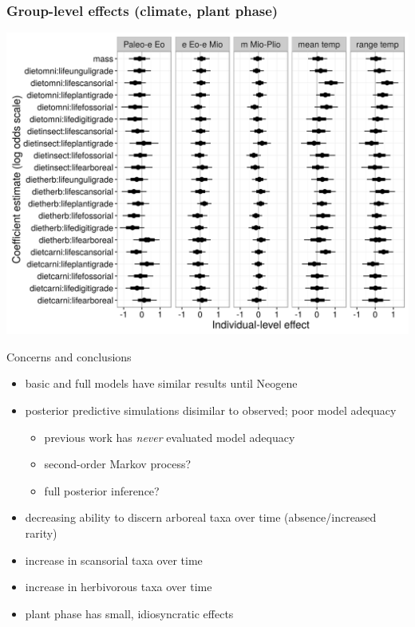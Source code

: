 \documentclass{beamer}
\begin{document}
\begin{frame}
  \frametitle{Group-level effects (climate, plant phase)}

  \begin{center}
    \includegraphics[height=0.8\textheight,width=\textwidth,keepaspectratio=true]{figure/gamma_est_full}
  \end{center}
\end{frame}


\begin{frame}
  \begin{block}{Concerns and conclusions}
    \begin{itemize}
      \item basic and full models have similar results until Neogene
      \item posterior predictive simulations disimilar to observed; poor model adequacy
        \begin{itemize}
          \item previous work has \emph{never} evaluated model adequacy
          \item second-order Markov process?
          \item full posterior inference?
        \end{itemize}
      \item decreasing ability to discern arboreal taxa over time (absence/increased rarity)
      \item increase in scansorial taxa over time
      \item increase in herbivorous taxa over time
      \item plant phase has small, idiosyncratic effects
    \end{itemize}
  \end{block}
\end{frame}
\end{document}
